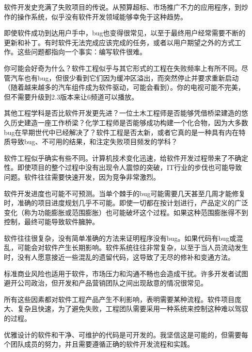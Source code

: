 软件开发史充满了失败项目的传说。从预算超标、市场推广不力的应用程序，到炒作的操作系统，似乎没有软件开发领域能够幸免于这种趋势。

即使软件成功到达用户手中，bug也变得很常见，以至于最终用户经常需要不断的更新和补丁。有时软件无法完成应该完成的任务，或者以用户期望之外的方式工作。这些问题都指向一个事实：编写软件很难。

你可能会好奇为什么？软件工程似乎与其它形式的工程在失败频率上有所不同。尽管汽车也有bug，但很少看到它们因为缓冲区溢出，而突然停止并要求重新启动（随着越来越多的汽车组件成为软件驱动，可能会看到）。你的电视可能不完美，但不需要升级到2.3版本来让6频道可以播放。

其他工程学科是否比软件开发更先进？一位土木工程师是否能够凭借桥梁建造的悠久历史建造一座工作桥梁？化学工程师是否能够成功构建一个化合物，因为大多数bug在早期世代中已经解决了？软件工程是否太新，或者它真的是一种具有内在特质导致bug、不可用的结果，和注定失败项目频发的学科？

软件工程似乎确实有些不同。计算机技术变化迅速，给软件开发过程带来了不确定性。即使项目的整个过程中没有出现令人震惊的突破，IT行业的步伐也可能导致问题。软件往往需要快速开发，因为竞争非常激烈。

软件开发进度也可能不可预测。当单个棘手的bug可能需要几天甚至几周才能修复时，准确的项目进度规划几乎不可能。即使一切都在按计划进行，产品定义的广泛变化（称为功能膨胀或范围膨胀）也可能破坏这个过程。如果这种范围膨胀得不到控制，最终可能导致软件臃肿。

软件往往很复杂，没有简单准确的方法来证明程序没有bug。如果代码有bug或混乱，可能会对软件产生长期影响。软件系统往往非常复杂，以至于当人员流动发生时，没有人愿意接近一些混乱的遗留代码，这导致了无尽的修补和变通方法。

标准商业风险也适用于软件，市场压力和沟通不畅也会造成干扰。许多开发者试图避开公司政治，但开发和产品营销团队之间出现敌意的情况很常见。

所有这些因素都对软件工程产品产生不利影响，表明需要某种流程。软件项目庞大、复杂且快速，为了避免失败，工程团队需要采用一种系统来控制这种难以驾驭的过程。

优雅设计的软件和干净、可维护的代码是可开发的。我坚信这是可能的，但需要每个团队成员的努力，并且需要遵循正确的软件开发流程和实践。



















